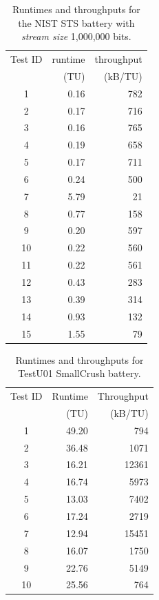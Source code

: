 \documentclass[
  digital,     %
  oneside,     %
  nosansbold,  %
  nocolorbold, %
  nolof,         %
  nolot,         %
]{fithesis4}
\begin{document}
\begin{table}[H]
  \begin{tabularx}{0.5\textwidth}{c|r|r}
    Test ID & runtime & throughput\\
     & (TU) & (kB/TU) \\
    \midrule
    1 & 0.16 & 782 \\
    2 & 0.17 & 716 \\
    3 & 0.16 & 765 \\
    4 & 0.19 & 658 \\
    5 & 0.17 & 711 \\
    6 & 0.24 & 500 \\
    7 & 5.79 & 21 \\
    8 & 0.77 & 158 \\
    9 & 0.20 & 597 \\
    10 & 0.22 & 560 \\
    11 & 0.22 & 561 \\
    12 & 0.43 & 283 \\
    13 & 0.39 & 314 \\
    14 & 0.93 & 132 \\
15 & 1.55 & 79 \\
  \end{tabularx}
  \caption{Runtimes and throughputs for the NIST STS battery with \emph{stream size} 1,000,000 bits.}
  \label{tab:analysis_nist_time}
\end{table}


\begin{table}[H]
  \begin{tabularx}{0.5\textwidth}{c|r|r}
    Test ID & Runtime & Throughput\\
     & (TU) & (kB/TU) \\
    \midrule
    1 & 49.20 & 794 \\
    2 & 36.48 & 1071 \\
    3 & 16.21 & 12361 \\
    4 & 16.74 & 5973 \\
    5 & 13.03 & 7402 \\
    6 & 17.24 & 2719 \\
    7 & 12.94 & 15451 \\
    8 & 16.07 & 1750 \\
    9 & 22.76 & 5149 \\
    10 & 25.56 & 764 \\
  \end{tabularx}
  \caption{Runtimes and throughputs for TestU01 SmallCrush battery.}
  \label{tab:analysis_smallcrush_time}
\end{table}
\end{document}
